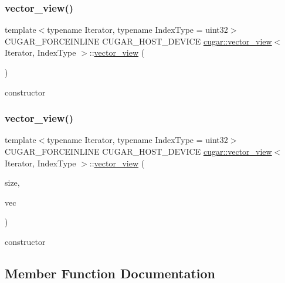 \subsubsection{\texorpdfstring{vector\+\_\+view()}{vector\_view()}\hspace{0.1cm}{\footnotesize\ttfamily [1/2]}}
{\footnotesize\ttfamily template$<$typename Iterator, typename Index\+Type = uint32$>$ \\
C\+U\+G\+A\+R\+\_\+\+F\+O\+R\+C\+E\+I\+N\+L\+I\+NE C\+U\+G\+A\+R\+\_\+\+H\+O\+S\+T\+\_\+\+D\+E\+V\+I\+CE \hyperlink{structcugar_1_1vector__view}{cugar\+::vector\+\_\+view}$<$ Iterator, Index\+Type $>$\+::\hyperlink{structcugar_1_1vector__view}{vector\+\_\+view} (\begin{DoxyParamCaption}{ }\end{DoxyParamCaption})\hspace{0.3cm}{\ttfamily [inline]}}

constructor \mbox{\label{structcugar_1_1vector__view_a3be7d304f396892386ca3490f81eeee1}} 
\subsubsection{\texorpdfstring{vector\+\_\+view()}{vector\_view()}\hspace{0.1cm}{\footnotesize\ttfamily [2/2]}}
{\footnotesize\ttfamily template$<$typename Iterator, typename Index\+Type = uint32$>$ \\
C\+U\+G\+A\+R\+\_\+\+F\+O\+R\+C\+E\+I\+N\+L\+I\+NE C\+U\+G\+A\+R\+\_\+\+H\+O\+S\+T\+\_\+\+D\+E\+V\+I\+CE \hyperlink{structcugar_1_1vector__view}{cugar\+::vector\+\_\+view}$<$ Iterator, Index\+Type $>$\+::\hyperlink{structcugar_1_1vector__view}{vector\+\_\+view} (\begin{DoxyParamCaption}\item[{const Index\+Type}]{size,  }\item[{Iterator}]{vec }\end{DoxyParamCaption})\hspace{0.3cm}{\ttfamily [inline]}}

constructor 

\subsection{Member Function Documentation}
\mbox{\label{structcugar_1_1vector__view_a45c3064a266bf5685e7963970d72fc48}} 

